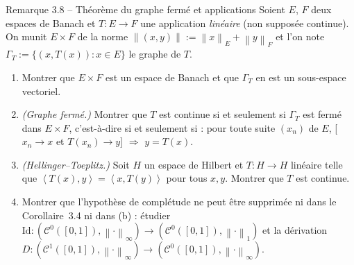 \documentclass[11pt,a4paper]{article}
\newcommand{\norm}[1]{\left\|#1\right\|}
\newcommand{\Cz}{\mathcal{C}^0}
\newcommand{\ie}{c'est-à-dire}
\newcommand{\ps}[2]{\left\langle #1,#2\right\rangle}
\theoremstyle{definition}
\begin{document}
\begin{exo}{Remarque 3.8 -- Théorème du graphe fermé et applications}
Soient $E$, $F$ deux espaces de Banach et $T:E\to F$ une application \emph{linéaire} (non supposée continue). On munit $E\times F$ de la norme $\norm{(x,y)}:=\norm x_E+\norm y_F$ et l'on note $\Gamma_T:=\{(x,T(x)):x\in E\}$ le graphe de $T$.
\begin{enumerate}[label=(\alph*)]
  \item Montrer que $E\times F$ est un espace de Banach et que $\Gamma_T$ en est un sous-espace vectoriel.
  \item \emph{(Graphe fermé.)} Montrer que $T$ est continue si et seulement si $\Gamma_T$ est fermé dans $E\times F$, \ie{} si et seulement si : pour toute suite $(x_n)$ de $E$, [$x_n\to x$ et $T(x_n)\to y$] $\Rightarrow$ $y=T(x)$.
  \item \emph{(Hellinger--Toeplitz.)} Soit $H$ un espace de Hilbert et $T:H\to H$ linéaire telle que $\ps{T(x)}y=\ps x{T(y)}$ pour tous $x,y$. Montrer que $T$ est continue.
  \item Montrer que l'hypothèse de complétude ne peut être supprimée ni dans le Corollaire~3.4 ni dans (b) : étudier $\mathrm{Id}:(\Cz([0,1]),\norm\cdot_\infty)\to(\Cz([0,1]),\norm\cdot_1)$ et la dérivation $D:(\mathcal C^1([0,1]),\norm\cdot_\infty)\to(\Cz([0,1]),\norm\cdot_\infty)$.
\end{enumerate}
\end{exo}
\end{document}
